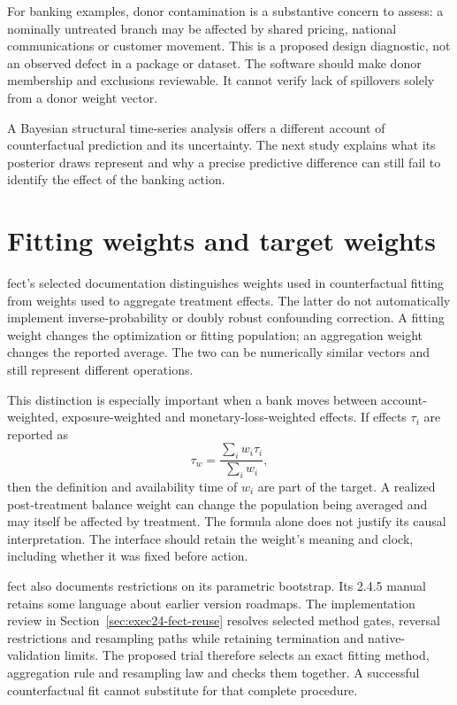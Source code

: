 For banking examples, donor contamination is a substantive concern to assess:
a nominally untreated branch may be affected by shared pricing, national
communications or customer movement. This is a proposed design diagnostic,
not an observed defect in a package or dataset. The software should make donor
membership and exclusions reviewable. It cannot verify lack of spillovers
solely from a donor weight vector.

A Bayesian structural time-series analysis offers a different account of
counterfactual prediction and its uncertainty. The next study explains what
its posterior draws represent and why a precise predictive difference can
still fail to identify the effect of the banking action.



\section{Fitting weights and target weights}

fect's selected documentation distinguishes weights used in counterfactual
fitting from weights used to aggregate treatment effects. The latter do not
automatically implement inverse-probability or doubly robust confounding
correction. A fitting weight changes the optimization or fitting population;
an aggregation weight changes the reported average. The two can be numerically
similar vectors and still represent different operations. \cite{v12_sw_fect}

This distinction is especially important when a bank moves between
account-weighted, exposure-weighted and monetary-loss-weighted effects.
If effects \(\tau_i\) are reported as
\[
 \tau_w=\frac{\sum_i w_i\tau_i}{\sum_i w_i},
\]
then the definition and availability time of \(w_i\) are part of the target.
A realized post-treatment balance weight can change the population being
averaged and may itself be affected by treatment. The formula alone does not
justify its causal interpretation. The interface should retain the weight's
meaning and clock, including whether it was fixed before action.

fect also documents restrictions on its parametric bootstrap. Its 2.4.5
manual retains some language about earlier version roadmaps. The implementation
review in Section~\ref{sec:exec24-fect-reuse} resolves selected method gates,
reversal restrictions and resampling paths while retaining termination and
native-validation limits. The proposed trial therefore selects an exact fitting
method, aggregation rule and resampling law and checks them together. A
successful counterfactual fit cannot substitute for that complete procedure.

